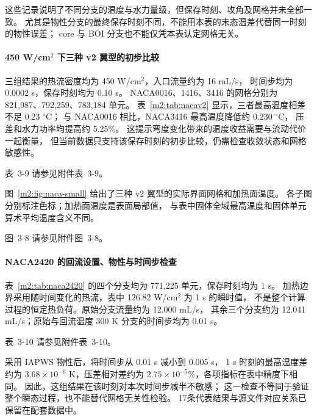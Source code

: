 \documentclass[UTF8]{midterm}
\makeatletter
\newcommand{\submissionnumber}[1]{\def\@currentlabel{#1}}
\makeatother
\begin{document}
这些记录说明了不同分支的温度与水力量级，但保存时刻、攻角及网格并未全部一致。
尤其是物性分支的最终保存时刻不同，不能用本表的末态温差代替同一时刻的物性误差；
core 与 BOI 分支也不能仅凭本表认定网格无关。

\paragraph{450 W/cm$^2$ 下三种 v2 翼型的初步比较}
三组结果的热流密度均为 450 W/cm$^2$，入口流量约为 16 mL/s，
时间步均为 0.0002 s，保存时刻均为 0.10 s。
NACA0016、1416、3416 的网格分别为 821,987、792,259、783,184 单元。
表~\ref{m2:tab:nacav2} 显示，三者最高温度相差不足 0.23 $^\circ$C；
与 NACA0016 相比，NACA3416 最高温度降低约 0.230 $^\circ$C，
压差和水力功率均提高约 5.25\%。
这提示弯度变化带来的温度收益需要与流动代价一起衡量，
但当前数据只支持该保存时刻的初步比较，仍需检查收敛状态和网格敏感性。

\par\noindent \begingroup\submissionnumber{3-9}\label{m2:tab:nacav2}\endgroup 表~3-9 请参见附件表~3-9。\par


图~\ref{m2:fig:naca-small} 给出了三种 v2 翼型的实际界面网格和加热面温度。
各子图分别标注色标；加热面温度是表面局部值，
与表中固体全域最高温度和固体单元算术平均温度含义不同。


\par\noindent \begingroup\submissionnumber{3-8}\label{m2:fig:naca-small}\endgroup 图~3-8 请参见附件图~3-8。\par


\paragraph{NACA2420 的回流设置、物性与时间步检查}
表~\ref{m2:tab:naca2420} 的四个分支均为 771,225 单元，保存时刻均为 1 s。
加热边界采用随时间变化的热流，表中 126.82 W/cm$^2$ 为 1 s 的瞬时值，
不是整个计算过程的恒定热负荷。原始分支流量约为 12.000 mL/s，
其余三个分支约为 12.041 mL/s；原始与回流温度 300 K 分支的时间步均为 0.01 s。

\par\noindent \begingroup\submissionnumber{3-10}\label{m2:tab:naca2420}\endgroup 表~3-10 请参见附件表~3-10。\par


采用 IAPWS 物性后，将时间步从 0.01 s 减小到 0.005 s，
1 s 时刻的最高温度差约为 $3.68\times10^{-6}$ K，压差相对差约为
$2.75\times10^{-5}\%$，各项指标在表中精度下相同。
因此，这组结果在该时刻对本次时间步减半不敏感；
这一检查不等同于验证整个瞬态过程，也不能替代网格无关性检验。
17条代表结果与源文件对应关系已保留在配套数据中\cite{stagereports}。
\end{document}

